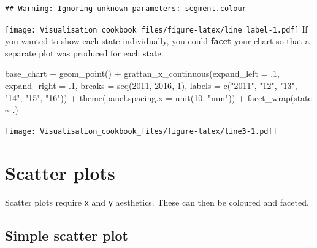\documentclass[
]{book}
\newenvironment{Shaded}{\begin{snugshade}}{\end{snugshade}}
\newcommand{\AttributeTok}[1]{\textcolor[rgb]{0.77,0.63,0.00}{#1}}
\newcommand{\DecValTok}[1]{\textcolor[rgb]{0.00,0.00,0.81}{#1}}
\newcommand{\FunctionTok}[1]{\textcolor[rgb]{0.00,0.00,0.00}{#1}}
\newcommand{\NormalTok}[1]{#1}
\newcommand{\SpecialCharTok}[1]{\textcolor[rgb]{0.00,0.00,0.00}{#1}}
\newcommand{\StringTok}[1]{\textcolor[rgb]{0.31,0.60,0.02}{#1}}
\begin{document}
\begin{verbatim}
## Warning: Ignoring unknown parameters: segment.colour
\end{verbatim}

\texttt{[image: Visualisation\_cookbook\_files/figure-latex/line\_label-1.pdf]}
If you wanted to show each state individually, you could \textbf{facet} your chart so that a separate plot was produced for each state:

\begin{Shaded}
\begin{Highlighting}[]
\NormalTok{base\_chart }\SpecialCharTok{+}
  \FunctionTok{geom\_point}\NormalTok{() }\SpecialCharTok{+}
    \FunctionTok{grattan\_x\_continuous}\NormalTok{(}\AttributeTok{expand\_left =}\NormalTok{ .}\DecValTok{1}\NormalTok{, }
                         \AttributeTok{expand\_right =}\NormalTok{ .}\DecValTok{1}\NormalTok{,}
                         \AttributeTok{breaks =} \FunctionTok{seq}\NormalTok{(}\DecValTok{2011}\NormalTok{, }\DecValTok{2016}\NormalTok{, }\DecValTok{1}\NormalTok{),}
                         \AttributeTok{labels =} \FunctionTok{c}\NormalTok{(}\StringTok{"2011"}\NormalTok{, }\StringTok{"12"}\NormalTok{, }\StringTok{"13"}\NormalTok{, }\StringTok{"14"}\NormalTok{, }\StringTok{"15"}\NormalTok{, }\StringTok{"16"}\NormalTok{)) }\SpecialCharTok{+} 
  \FunctionTok{theme}\NormalTok{(}\AttributeTok{panel.spacing.x =} \FunctionTok{unit}\NormalTok{(}\DecValTok{10}\NormalTok{, }\StringTok{"mm"}\NormalTok{)) }\SpecialCharTok{+} 
  \FunctionTok{facet\_wrap}\NormalTok{(state }\SpecialCharTok{\textasciitilde{}}\NormalTok{ .)}
\end{Highlighting}
\end{Shaded}

\texttt{[image: Visualisation\_cookbook\_files/figure-latex/line3-1.pdf]}

\hypertarget{scatter-plots}{%
\section{Scatter plots}\label{scatter-plots}}

Scatter plots require \texttt{x} and \texttt{y} aesthetics. These can then be coloured and faceted.

\hypertarget{simple-scatter-plot}{%
\subsection{Simple scatter plot}\label{simple-scatter-plot}}
\end{document}
